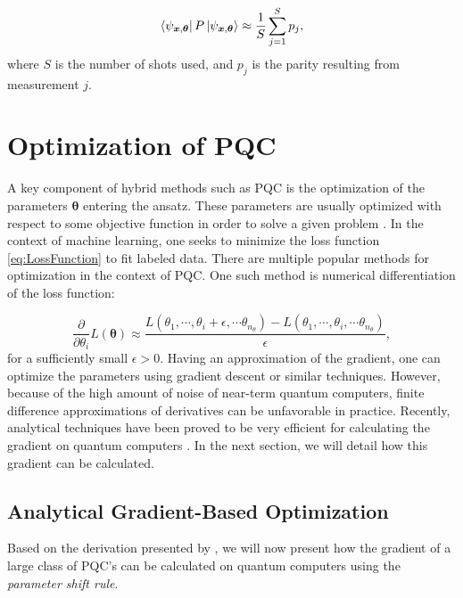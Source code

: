 \begin{equation}
    \bra{\psi_{\boldsymbol{x},\boldsymbol{\theta}}}P 
    \ket{\psi_{\boldsymbol{x},\boldsymbol{\theta}}}
    \approx
    \frac{1}{S} \sum_{j=1}^S p_j,
\end{equation}
where $S$ is the number of shots used, and $p_j$ is the parity resulting from measurement $j$.


\section{Optimization of PQC}\label{sec:OptPQC}
A key component of hybrid methods such as PQC is the optimization of the parameters $\boldsymbol{\theta}$ entering the ansatz. These parameters are usually optimized with respect to some objective function in order to solve a given problem \cite{Benedetti_2019}. In the context of machine learning, one seeks to minimize the loss function \autoref{eq:LossFunction} to fit labeled data. There are multiple popular methods for optimization in the context of PQC. One such method is numerical differentiation of the loss function:

\begin{equation}
    \frac{\partial}{\partial \theta_i} L(\boldsymbol{\theta}) 
    \approx \frac{L(\theta_1, \cdots, \theta_i + \epsilon, \cdots \theta_{n_{\theta}}) - L(\theta_1, \cdots, \theta_i, \cdots \theta_{n_{\theta}})}{\epsilon},
\end{equation}
for a sufficiently small $\epsilon>0$. Having an approximation of the gradient, one can optimize the parameters using gradient descent or similar techniques. However, because of the high amount of noise of near-term quantum computers, finite difference approximations of derivatives can be unfavorable in practice. Recently, analytical techniques have been proved to be very efficient for calculating the gradient on quantum computers \cite{abbas2020power, Benedetti_2019}. In the next section, we will detail how this gradient can be calculated. 

\subsection{Analytical Gradient-Based Optimization}\label{sec:AnalyticalGrad}
Based on the derivation presented by \cite{Schuld_2019}, we will now present how the gradient of a large class of PQC's can be calculated on quantum computers using the \emph{parameter shift rule}.

